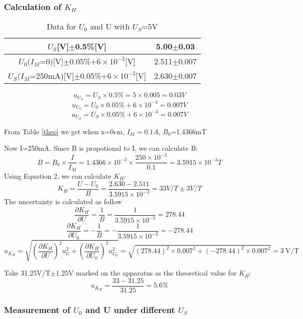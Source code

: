\documentclass[12pt,a4paper]{article}
\begin{document}
\subsubsection{Calculation of $K_H$}
\begin{table}[H]
    \centering
    \begin{tabular}{|c|c|}
    \hline
    $U_S$[V]$\pm$0.5\%[V] & 5.00$\pm$0.03  \\ \hline
    $U_0$($I_M$=0)[V]$\pm$0.05\%+$6\times 10^{-3}$[V] & 2.511$\pm$0.007 \\ \hline
    $U_S$($I_M$=250mA)[V]$\pm$0.05\%+$6\times 10^{-3}$[V] & 2.630$\pm$0.007 \\ \hline
    \end{tabular}
    \caption{Data for $U_0$ and U with $U_S$=5V}
    \end{table}
$$u_{U_S}=U_S\times 0.5\%=5\times 0.005=0.03V$$
$$u_{U_0}=U_0\times 0.05\%+6\times 10^{-3}=0.007V$$
$$u_{U_S}=U_S\times 0.05\%+6\times 10^{-3}=0.007V$$

From Table \ref{theo} we get when x=0cm, $I_M=0.1A$, $B_0$=1.4366mT\par
Now I=250mA. Since B is propotional to I, we can calculate B:
$$B=B_0\times \frac{I}{I_M}=1.4366\times 10^{-3}\times \frac{250\times 10^{-3}}{0.1}=3.5915\times 10^{-3}T$$
Using Equation 2, we can calculate $K_H$:
$$K_H=\frac{U-U_0}{B}=\frac{2.630-2.511}{3.5915\times 10^{-3}}=33V/T\pm 3V/T$$
The uncertainty is calculated as follow
$$\frac{\partial K_H}{\partial U}=\frac{1}{B}=\frac{1}{3.5915\times 10^{-3}}=278.44$$
$$\frac{\partial K_H}{\partial U_0}=-\frac{1}{B}=-\frac{1}{3.5915\times 10^{-3}}=-278.44$$
$$u_{K_{H}}=\sqrt{\left(\frac{\partial K_{H}}{\partial U}\right)^{2} u_{U}^{2}+\left(\frac{\partial K_{H}}{\partial U_{0}}\right)^{2} u_{U_{0}}^{2}}=\sqrt{(278.44)^{2} \times 0.007^{2}+(-278.44)^{2} \times 0.007^{2}}=3 \mathrm{~V} / \mathrm{T}$$

Take 31.25V/T$\pm$1.25V marked on the apparatus as the theoretical value for $K_H$:
$$u_{K_H}=\frac{33-31.25}{31.25}=5.6\%$$

\subsubsection{Measurement of $U_0$ and U under different $U_S$}
\end{document}
